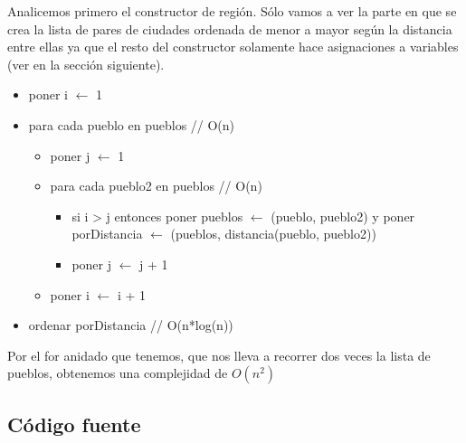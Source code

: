 Analicemos primero el constructor de regi\'on. S\'olo vamos a ver la parte en que se crea la lista de pares de ciudades ordenada de menor a mayor seg\'un la distancia entre ellas ya que el resto del constructor solamente hace asignaciones a variables (ver en la secci\'on siguiente).
\begin{itemize}
\item poner i $\leftarrow$ 1
\item para cada pueblo en pueblos  \/// O(n) 
\begin{itemize}
	\item poner j $\leftarrow$ 1
	\item para cada pueblo2 en pueblos \/// O(n)
	\begin{itemize}
		\item si i > j entonces poner pueblos $\leftarrow$ (pueblo, pueblo2) y poner porDistancia $\leftarrow$ (pueblos, distancia(pueblo, pueblo2))
		\item poner j $\leftarrow$ j + 1
	\end{itemize}
	\item poner i $\leftarrow$ i + 1
\end{itemize}
\item ordenar porDistancia \/// O(n*log(n)) 
\end{itemize}

Por el for anidado que tenemos, que nos lleva a recorrer dos veces la lista de pueblos, obtenemos una complejidad de $O(n^2)$

\subsection{C\'odigo fuente}

